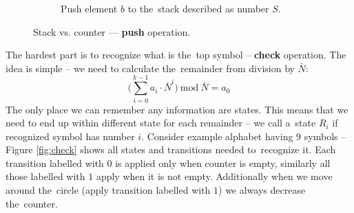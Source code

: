 \documentclass[english,shortabstract,mgr]{iithesis}
\begin{document}
\begin{figure}[H]
\begin{subfigure}[b]{0.6\textwidth}

    \captionsetup{font=footnotesize}
    \caption{Push element $b$ to the~stack described as number $S$.}

  \end{subfigure}

  \caption{Stack vs. counter --- \textbf{push} operation.}
  \label{fig:push_operation}

\end{figure}


The hardest part is to recognize what is the~top symbol -- \textbf{check} operation.
The idea is simple -- we need to calculate the~remainder from division by $\bar{N}$:
$$ \Bigg( \sum_{i=0}^{k-1} a_i \cdot \bar{N}^i \Bigg) \ \mathrm{mod} \ \bar{N} = a_0 $$
The only place we can remember any information are states. This means that we need
to end up within different state for each remainder -- we call a~state $R_i$ if
recognized symbol has number $i$. Consider example alphabet having $9$ symbols -- Figure
\ref{fig:check} shows all states and transitions needed to~recognize it. Each
transition labelled with $0$ is applied only when counter is empty, similarly
all those labelled with $1$ apply when it is not empty. Additionally when we move around
the~circle (apply transition labelled with $1$) we always decrease the~counter.
\end{document}
